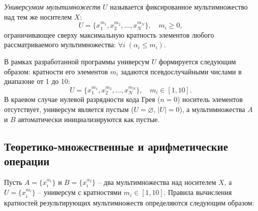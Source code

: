 \documentclass[14pt, a4paper]{extarticle}
\begin{document}
	\textit{Универсумом мультимножеств} $U$ называется фиксированное мультимножество над тем же носителем $X$:
	\begin{equation}
		U = \{x_1^{m_1}, x_2^{m_2}, \dots, x_N^{m_N}\}, \quad m_i \ge 0,
	\end{equation}
	ограничивающее сверху максимальную кратность элементов любого рассматриваемого мультимножества: $\forall i \; (\alpha_i \le m_i)$.
	
	В рамках разработанной программы универсум $U$ формируется следующим образом: кратности его элементов $m_i$ задаются псевдослучайными числами в диапазоне от 1 до 10:
	\begin{equation}
		U = \{x_1^{m_1}, x_2^{m_2}, \dots, x_N^{m_N}\}, \quad m_i \in [1, 10].
	\end{equation}
	В краевом случае нулевой разрядности кода Грея ($n = 0$) носитель элементов отсутствует, универсум является пустым ($U = \varnothing$, $|U| = 0$), а мультимножества $A$ и $B$ автоматически инициализируются как пустые.
	
	\subsection{Теоретико-множественные и арифметические операции}
	
	Пусть $A = \{x_i^{\alpha_1}\}$ и $B = \{x_i^{\alpha_2}\}$ -- два мультимножества над носителем $X$, а $U = \{x_i^{m_i}\}$ -- универсум с кратностями $m_i \in [1, 10]$. Правила вычисления кратностей результирующих мультимножеств определяются следующим образом:
	
\end{document}
